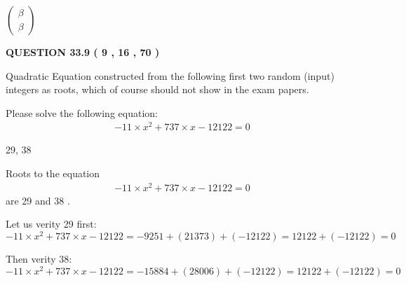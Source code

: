 \documentclass[12pt]{article}
\begin{document}
   
 $  \left( \begin{array}
 {
 c
 }
 \beta \\ 
 \beta
 \end{array} \right) $ 
  
\vspace{0.2in}
  
{\textbf{\Large{QUESTION
33.9 
 (           9 ,          16 ,          70 )
}}}
  
  


\noindent{}
Quadratic Equation constructed from the following first two random (input) integers as roots,  
which of course should not show in the exam papers.  
\noindent{}


 
 

 
Please solve the following equation:
\begin{eqnarray*}
-11 \times x^2  %
+  %
737
                 \times x    %
-12122 =0
\end{eqnarray*}
 
 
 
\noindent{}
 
 

29,  %
38
 
 
 
\noindent{}
 
 

 
 
 
\noindent{}
 
 

Roots to the equation
\begin{eqnarray*}
-11 \times x^2  %
+  %
737
                 \times x    %
-12122 =0
\end{eqnarray*}
are  %
29 and  %
38 .
 
Let us verity  %
29 first:
$  %
-11 \times x^2  %
+  %
737
                 \times x    %
-12122
  = %
-9251+( %
21373)+( %
-12122)
  = %
12122+( %
-12122)
  = %
0
$
 
Then verity  %
38:
$  %
-11 \times x^2  %
+  %
737
                 \times x    %
-12122
  = %
-15884+( %
28006)+( %
-12122)
  = %
12122+( %
-12122)
  = %
0
$
 
\end{document}
